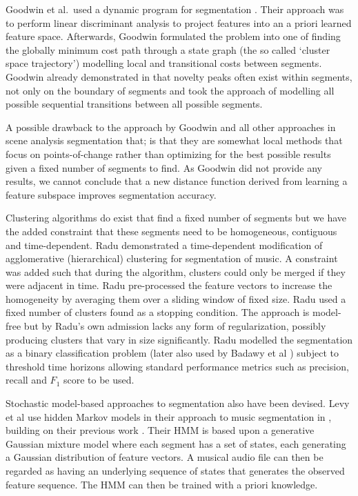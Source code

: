 \documentclass[twocolumn]{article}
\begin{document}
	Goodwin et al.\ used a dynamic program for segmentation \citep{goodwin2004dynamic}. Their approach was to perform linear discriminant analysis to project features into an a priori learned feature space. Afterwards, Goodwin formulated the problem into one of finding the globally minimum cost path through a state graph (the so called `cluster space trajectory') modelling local and transitional costs between segments. Goodwin already demonstrated in \citep{goodwin2003audio} that novelty peaks often exist within segments, not only on the boundary of segments and took the approach of modelling all possible sequential transitions between all possible segments.
	
	A possible drawback to the approach by Goodwin and all other approaches in scene analysis segmentation that; is that they are somewhat local methods that focus on points-of-change rather than optimizing for the best possible results given a fixed number of segments to find. As Goodwin did not provide any results, we cannot conclude that a new distance function derived from learning a feature subspace improves segmentation accuracy. 
	
	Clustering algorithms do exist that find a fixed number of segments but we have the added constraint that these segments need to be homogeneous, contiguous and time-dependent. Radu \citep{radu} demonstrated a time-dependent modification of agglomerative (hierarchical) clustering for segmentation of music. A constraint was added such that during the algorithm, clusters could only be merged if they were adjacent in time. Radu pre-processed the feature vectors to increase the homogeneity by averaging them over a sliding window of fixed size. Radu used a fixed number of clusters found as a stopping condition. The approach is model-free but by Radu's own admission lacks any form of regularization, possibly producing clusters that vary in size significantly. Radu modelled the segmentation as a binary classification problem (later also used by Badawy et al \citep{elaudio}) subject to threshold time horizons allowing standard performance metrics such as precision, recall and $F_1$ score to be used. 
	
	Stochastic model-based approaches to segmentation also have been devised. Levy et al use hidden Markov models in their approach to music segmentation in \citep{levy2008structural}, building on their previous work \citep{levy2006new, levy2006extraction}. Their HMM is based upon a generative Gaussian mixture model where each segment has a set of states, each generating a Gaussian distribution of feature vectors. A musical audio file can then be regarded as having an underlying sequence of states that generates the observed feature sequence. The HMM can then be trained with a priori knowledge. 
	
\end{document}
